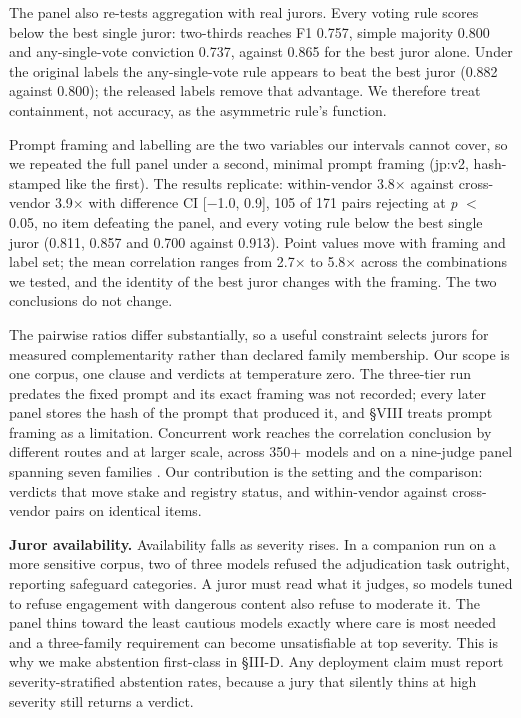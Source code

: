 \documentclass[conference]{IEEEtran}
\begin{document}
The panel also re-tests aggregation with real jurors. Every voting rule scores below the best single juror: two-thirds reaches F1 0.757, simple majority 0.800 and any-single-vote conviction 0.737, against 0.865 for the best juror alone. Under the original labels the any-single-vote rule appears to beat the best juror (0.882 against 0.800); the released labels remove that advantage. We therefore treat containment, not accuracy, as the asymmetric rule's function.

Prompt framing and labelling are the two variables our intervals cannot cover, so we repeated the full panel under a second, minimal prompt framing (jp:v2, hash-stamped like the first). The results replicate: within-vendor 3.8$\times$ against cross-vendor 3.9$\times$ with difference CI [$-$1.0, 0.9], 105 of 171 pairs rejecting at \textit{p} $<$ 0.05, no item defeating the panel, and every voting rule below the best single juror (0.811, 0.857 and 0.700 against 0.913). Point values move with framing and label set; the mean correlation ranges from 2.7$\times$ to 5.8$\times$ across the combinations we tested, and the identity of the best juror changes with the framing. The two conclusions do not change.

The pairwise ratios differ substantially, so a useful constraint selects jurors for measured complementarity rather than declared family membership. Our scope is one corpus, one clause and verdicts at temperature zero. The three-tier run predates the fixed prompt and its exact framing was not recorded; every later panel stores the hash of the prompt that produced it, and \S{}VIII treats prompt framing as a limitation. Concurrent work reaches the correlation conclusion by different routes and at larger scale, across 350+ models \cite{r39} and on a nine-judge panel spanning seven families \cite{r40}. Our contribution is the setting and the comparison: verdicts that move stake and registry status, and within-vendor against cross-vendor pairs on identical items.

\textbf{Juror availability.} Availability falls as severity rises. In a companion run on a more sensitive corpus, two of three models refused the adjudication task outright, reporting safeguard categories. A juror must read what it judges, so models tuned to refuse engagement with dangerous content also refuse to moderate it. The panel thins toward the least cautious models exactly where care is most needed and a three-family requirement can become unsatisfiable at top severity. This is why we make abstention first-class in \S{}III-D. Any deployment claim must report severity-stratified abstention rates, because a jury that silently thins at high severity still returns a verdict.
\end{document}
